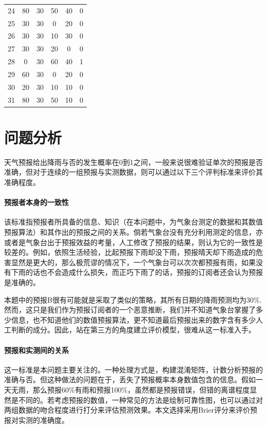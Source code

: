\documentclass[a4paper,12pt,onecolumn,twoside]{article}
\begin{document}
\begin{longtable}{cccccc}
		24 & 80      & 30      & 50      & 40      & 0   \\
		25 & 30      & 30      & 0       & 20      & 0   \\
		26 & 30      & 30      & 10      & 30      & 0   \\
		27 & 30      & 30      & 20      & 0       & 0   \\
		28 & 0       & 30      & 60      & 40      & 1   \\
		29 & 60      & 30      & 0       & 20      & 0   \\
		30 & 20      & 30      & 10      & 10      & 0   \\
		31 & 80      & 30      & 50      & 10      & 0   \\
		\hline
\end{longtable}

\section{问题分析}
天气预报给出降雨与否的发生概率在0到1之间，一般来说很难验证单次的预报是否准确，但对于连续的一组预报与实测数据，则可以通过以下三个评判标准来评价其准确程度。
\paragraph{预报者本身的一致性}
该标准指预报者所具备的信息、知识（在本问题中，为气象台测定的数据和其数值预报算法）和其作出的预报之间的关系。倘若气象台没有充分利用测定的信息，亦或者是气象台出于预报效益的考量，人工修改了预报的结果，则认为它的一致性是较差的。例如，依照生活经验，比起预报下雨却没下雨，预报晴天却下雨造成的危害显然是更大的，那么极荒谬的情况下，一个气象台可以次次都预报有雨，如果没有下雨的话也不会造成什么损失，而正巧下雨了的话，预报的订阅者还会认为预报是准确的。\par
本题中的预报B很有可能就是采取了类似的策略，其所有日期的降雨预测均为30\%. 然而，这只是我们作为预报订阅者的一个恶意推断，我们并不知道气象台掌握了多少信息，也不知道他们的数值预报算法，更不知道最后预报出来的数字含有多少人工判断的成分。因此，站在第三方的角度建立评价模型，很难从这一标准入手。
\paragraph{预报和实测间的关系}
这一标准是本问题主要关注的。一种处理方式是，构建混淆矩阵，计数分析预报的准确与否。但这种做法的问题在于，丢失了预报概率本身数值包含的信息。假如一天无雨，那么预报60\%有雨和预报100\%，虽然都是预报错误，但错的离谱程度显然是不同的。若考虑预报的数值，一种常见的方法是绘制可靠性图，也可以通过对两组数据的吻合程度进行打分来评估预测效果。本文选择采用Brier评分来评价预报对实测的准确度。
\end{document}
